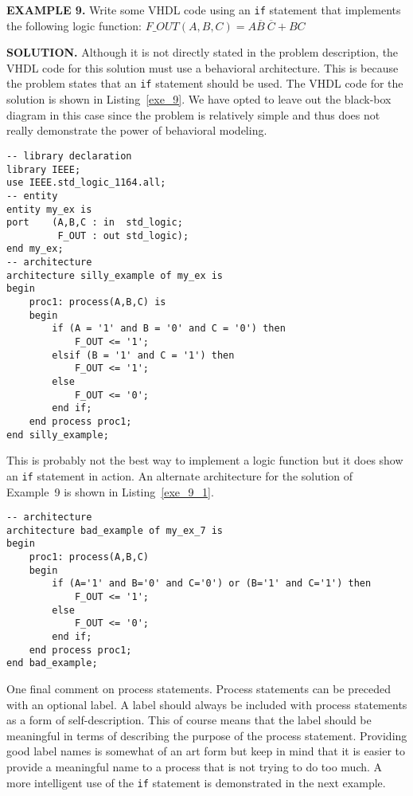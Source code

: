 \begin{leftbar}
\noindent
\textbf{EXAMPLE 9.}
Write some VHDL code  using an \texttt{if} statement that implements the following logic function: 
$F\_OUT(A,B,C)=A\overline{B}~\!\overline{C}+BC$
\end{leftbar}
\noindent
\textbf{SOLUTION.} Although it is not directly stated in the problem description, the VHDL code for this solution must use a behavioral architecture. This is because the problem states that an \texttt{if} statement should be used. The VHDL code for the solution is shown in Listing~\ref{exe_9}. We have opted to leave out the black-box diagram in this case since the problem is relatively simple and thus does not really demonstrate the power of behavioral modeling.

\noindent
\begin{minipage}{0.99\linewidth}
\begin{lstlisting}[label=exe_9, caption=Solution to Example~9.]
-- library declaration
library IEEE;
use IEEE.std_logic_1164.all;
-- entity
entity my_ex is
port 	(A,B,C : in  std_logic;
	 	 F_OUT : out std_logic);
end my_ex;
-- architecture
architecture silly_example of my_ex is
begin
	proc1: process(A,B,C) is
	begin
		if (A = '1' and B = '0' and C = '0') then
	   		F_OUT <= '1';
		elsif (B = '1' and C = '1') then
	   		F_OUT <= '1';
		else
	   		F_OUT <= '0';
		end if;
	end process proc1;
end silly_example;
\end{lstlisting}
\end{minipage}

This is probably not the best way to implement a logic function but it does show an \texttt{if} statement in action. An alternate architecture for the solution of Example~9 is shown in Listing~\ref{exe_9_1}.

\noindent
\begin{minipage}{0.99\linewidth}
\begin{lstlisting}[label=exe_9_1, caption=Alternative solution to Example~9.]
-- architecture
architecture bad_example of my_ex_7 is
begin
	proc1: process(A,B,C)
	begin
		if (A='1' and B='0' and C='0') or (B='1' and C='1') then
	   		F_OUT <= '1';
		else
	   		F_OUT <= '0';
		end if;
	end process proc1;
end bad_example;
\end{lstlisting}
\end{minipage}

One final comment on process statements. Process statements can be preceded with an optional label. A label should always be included with process statements as a form of self-description. This of course means that the label should be meaningful in terms of describing the purpose of the process statement. Providing good label names is somewhat of an art form but keep in mind that it is easier to provide a meaningful name to a process that is not trying to do too much. A more intelligent use of the \texttt{if} statement is demonstrated in the next example.

